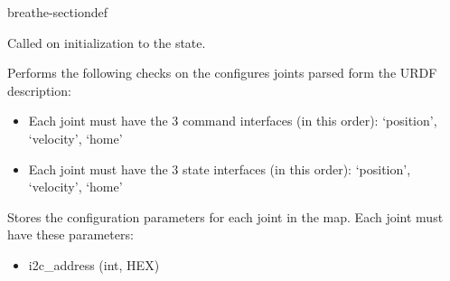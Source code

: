 \documentclass[letterpaper,10pt,english]{sphinxmanual}
\begin{document}
\begin{fulllineitems}
\begin{sphinxuseclass}{breathe-sectiondef}
\begin{fulllineitems}
\label{\detokenize{code/bioscara_hardware_interfaces/index:_CPPv4N28bioscara_hardware_interfaces28bioscara_hardware_interfaces28BioscaraArmHardwareInterface7on_initERKN18hardware_interface32HardwareComponentInterfaceParamsE}}\label{\detokenize{code/bioscara_hardware_interfaces/index:_CPPv3N28bioscara_hardware_interfaces28bioscara_hardware_interfaces28BioscaraArmHardwareInterface7on_initERKN18hardware_interface32HardwareComponentInterfaceParamsE}}\label{\detokenize{code/bioscara_hardware_interfaces/index:_CPPv2N28bioscara_hardware_interfaces28bioscara_hardware_interfaces28BioscaraArmHardwareInterface7on_initERKN18hardware_interface32HardwareComponentInterfaceParamsE}}\label{\detokenize{code/bioscara_hardware_interfaces/index:bioscara_hardware_interfaces::bioscara_hardware_interfaces::BioscaraArmHardwareInterface::on_init__hardware_interface::HardwareComponentInterfaceParamsCR}}
\pysigstartsignatures
\pysigstartmultiline
\pysiglinewithargsret
{\label{\detokenize{code/bioscara_hardware_interfaces/index:classbioscara__hardware__interfaces_1_1BioscaraArmHardwareInterface_1adf7c055a54ae3c1810743de2296585d4}}}
{}
{}
\pysigstopmultiline
\pysigstopsignatures
\sphinxAtStartPar
Called on initialization to the  state. 

\sphinxAtStartPar
Performs the following checks on the configures joints parsed form the URDF description:\begin{itemize}
\item {} 
\sphinxAtStartPar
Each joint must have the 3 command interfaces (in this order): ‘position’, ‘velocity’, ‘home’

\item {} 
\sphinxAtStartPar
Each joint must have the 3 state interfaces (in this order): ‘position’, ‘velocity’, ‘home’

\end{itemize}


\sphinxAtStartPar
Stores the configuration parameters for each joint in the {\hyperref[\detokenize{code/bioscara_hardware_interfaces/index:classbioscara__hardware__interfaces_1_1BioscaraArmHardwareInterface_1a24bfb6fef55ee2a8f659f82ab60b5a4b}]{}} map. Each joint must have these parameters:\begin{itemize}
\item {} 
\sphinxAtStartPar
i2c\_address (int, HEX)


\end{itemize}
\end{fulllineitems}
\end{sphinxuseclass}
\end{fulllineitems}
\end{document}

